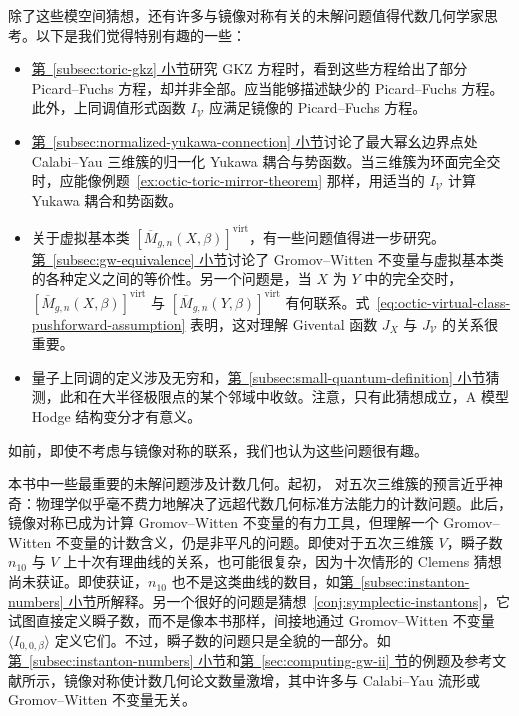 除了这些模空间猜想，还有许多与镜像对称有关的未解问题值得代数几何学家思考。以下是我们觉得特别有趣的一些：
\begin{itemize}
\item \hyperref[subsec:toric-gkz]{第~\ref*{subsec:toric-gkz} 小节}研究 GKZ 方程时，看到这些方程给出了部分 Picard--Fuchs 方程，却并非全部。应当能够描述缺少的 Picard--Fuchs 方程。此外，上同调值形式函数 $I_{\mathcal V}$ 应满足镜像的 Picard--Fuchs 方程。
\item \hyperref[subsec:normalized-yukawa-connection]{第~\ref*{subsec:normalized-yukawa-connection} 小节}讨论了最大幂幺边界点处 Calabi--Yau 三维簇的归一化 Yukawa 耦合与势函数。当三维簇为环面完全交时，应能像例题~\ref{ex:octic-toric-mirror-theorem} 那样，用适当的 $I_{\mathcal V}$ 计算 Yukawa 耦合和势函数。
\item 关于虚拟基本类 $[\overline M_{g,n}(X,\beta)]^{\mathrm{virt}}$，有一些问题值得进一步研究。\hyperref[subsec:gw-equivalence]{第~\ref*{subsec:gw-equivalence} 小节}讨论了 Gromov--Witten 不变量与虚拟基本类的各种定义之间的等价性。另一个问题是，当 $X$ 为 $Y$ 中的完全交时，$[\overline M_{g,n}(X,\beta)]^{\mathrm{virt}}$ 与
$[\overline M_{g,n}(Y,\beta)]^{\mathrm{virt}}$ 有何联系。式~\eqref{eq:octic-virtual-class-pushforward-assumption} 表明，这对理解 Givental 函数 $J_X$ 与 $J_{\mathcal V}$ 的关系很重要。
\item {}量子上同调的定义涉及无穷和，\hyperref[subsec:small-quantum-definition]{第~\ref*{subsec:small-quantum-definition} 小节}猜测，此和在大半径极限点的某个邻域中收敛。注意，只有此猜想成立，A 模型 Hodge 结构变分才有意义。
\end{itemize}
如前，即使不考虑与镜像对称的联系，我们也认为这些问题很有趣。

本书中一些最重要的未解问题涉及计数几何。起初， 对五次三维簇的预言近乎神奇：物理学似乎毫不费力地解决了远超代数几何标准方法能力的计数问题。此后，镜像对称已成为计算 Gromov--Witten 不变量的有力工具，但理解一个 Gromov--Witten 不变量的计数含义，仍是非平凡的问题。即使对于五次三维簇 $V$，瞬子数 $n_{10}$ 与 $V$ 上十次有理曲线的关系，也可能很复杂，因为十次情形的 Clemens 猜想尚未获证。即使获证，$n_{10}$ 也不是这类曲线的数目，如\hyperref[subsec:instanton-numbers]{第~\ref*{subsec:instanton-numbers} 小节}所解释。另一个很好的问题是猜想~\ref{conj:symplectic-instantons}，它试图直接定义瞬子数，而不是像本书那样，间接地通过 Gromov--Witten 不变量 $\langle I_{0,0,\beta}\rangle$ 定义它们。不过，瞬子数的问题只是全貌的一部分。如\hyperref[subsec:instanton-numbers]{第~\ref*{subsec:instanton-numbers} 小节}和\hyperref[sec:computing-gw-ii]{第~\ref*{sec:computing-gw-ii} 节}的例题及参考文献所示，镜像对称使计数几何论文数量激增，其中许多与 Calabi--Yau 流形或 Gromov--Witten 不变量无关。

